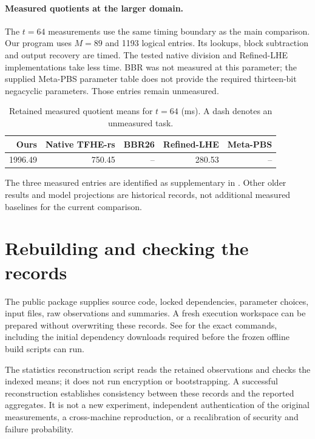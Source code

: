 \documentclass[11pt,a4paper]{article}
\begin{document}
\paragraph{Measured quotients at the larger domain.}
The $t=64$ measurements use the same timing boundary as the main comparison. Our program uses $M=89$ and 1193 logical entries. Its lookups, block subtraction and output recovery are timed. The tested native division and Refined-LHE implementations take less time. BBR was not measured at this parameter; the supplied Meta-PBS parameter table does not provide the required thirteen-bit negacyclic parameters. Those entries remain unmeasured.

\begin{table}[h]
\centering\small
\caption{Retained measured quotient means for $t=64$ (ms). A dash denotes an unmeasured task.}
\begin{tabular}{rrrrr}\toprule
Ours & Native TFHE-rs & BBR26 & Refined-LHE & Meta-PBS\\\midrule
1996.49 & 750.45 & -- & 280.53 & --\\\bottomrule
\end{tabular}
\end{table}
The three measured entries are identified as supplementary in . Other older results and model projections are historical records, not additional measured baselines for the current comparison.

\section{Rebuilding and checking the records}
The public package supplies source code, locked dependencies, parameter choices, input files, raw observations and summaries. A fresh execution workspace can be prepared without overwriting these records. See  for the exact commands, including the initial dependency downloads required before the frozen offline build scripts can run.

The statistics reconstruction script reads the retained observations and checks the indexed means; it does not run encryption or bootstrapping. A successful reconstruction establishes consistency between these records and the reported aggregates. It is not a new experiment, independent authentication of the original measurements, a cross-machine reproduction, or a recalibration of security and failure probability.
\end{document}
